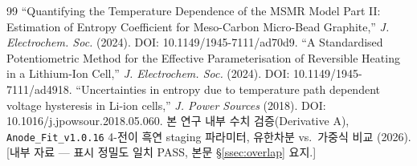 \documentclass[11pt,a4paper]{article}
\begin{document}
\begin{thebibliography}{99}
 ``Quantifying the Temperature Dependence of the MSMR Model Part II: Estimation of Entropy Coefficient for Meso-Carbon Micro-Bead Graphite,'' \emph{J. Electrochem. Soc.} (2024). DOI: 10.1149/1945-7111/ad70d9.
 ``A Standardised Potentiometric Method for the Effective Parameterisation of Reversible Heating in a Lithium-Ion Cell,'' \emph{J. Electrochem. Soc.} (2024). DOI: 10.1149/1945-7111/ad4918.
 ``Uncertainties in entropy due to temperature path dependent voltage hysteresis in Li-ion cells,'' \emph{J. Power Sources} (2018). DOI: 10.1016/j.jpowsour.2018.05.060.
 본 연구 내부 수치 검증(Derivative A), \texttt{Anode\_Fit\_v1.0.16} 4-전이 흑연 staging 파라미터, 유한차분 vs.\ 가중식 비교 (2026). [내부 자료 — 표시 정밀도 일치 PASS, 본문 \S\ref{ssec:overlap} 요지.]
\end{thebibliography}
\end{document}
